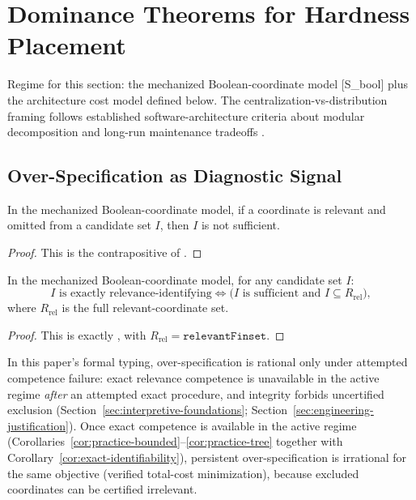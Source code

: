 \section{Dominance Theorems for Hardness Placement}\label{sec:implications}

Regime for this section: the mechanized Boolean-coordinate model [S\_bool] plus the architecture cost model defined below. The centralization-vs-distribution framing follows established software-architecture criteria about modular decomposition and long-run maintenance tradeoffs \cite{parnas1972criteria, brooks1987no, bass2012software, shaw1996software}.

\subsection{Over-Specification as Diagnostic Signal}

\begin{corollary}\label{cor:overmodel-diagnostic-implication}
In the mechanized Boolean-coordinate model, if a coordinate is relevant and omitted from a candidate set $I$, then $I$ is not sufficient.
\end{corollary}

\begin{proof}
This is the contrapositive of .
\end{proof}

\begin{corollary}\label{cor:exact-identifiability}
In the mechanized Boolean-coordinate model, for any candidate set $I$:
\[
I \text{ is exactly relevance-identifying}
\iff
\bigl(I \text{ is sufficient and } I \subseteq R_{\mathrm{rel}}\bigr),
\]
where $R_{\mathrm{rel}}$ is the full relevant-coordinate set.
\end{corollary}

\begin{proof}
This is exactly
,
with $R_{\mathrm{rel}}=\texttt{relevantFinset}$.
\end{proof}

\begin{remark}\label{rem:overmodel-conditional}
In this paper's formal typing, over-specification is rational only under attempted competence failure: exact relevance competence is unavailable in the active regime \emph{after} an attempted exact procedure, and integrity forbids uncertified exclusion (Section~\ref{sec:interpretive-foundations}; Section~\ref{sec:engineering-justification}).
Once exact competence is available in the active regime (Corollaries~\ref{cor:practice-bounded}--\ref{cor:practice-tree} together with Corollary~\ref{cor:exact-identifiability}), persistent over-specification is irrational for the same objective (verified total-cost minimization), because excluded coordinates can be certified irrelevant.
\end{remark}

